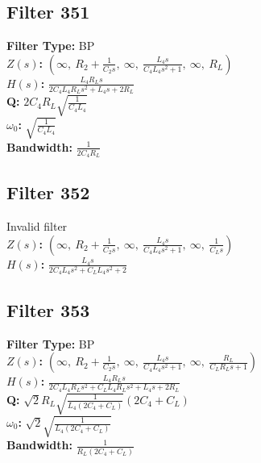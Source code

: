 \documentclass{article}
\begin{document}
\subsection*{Filter 351}
\textbf{Filter Type:} BP \\ 
\textbf{$Z(s)$:} $\left( \infty, \  R_{2} + \frac{1}{C_{2} s}, \  \infty, \  \frac{L_{4} s}{C_{4} L_{4} s^{2} + 1}, \  \infty, \  R_{L}\right)$ \\ 
\textbf{$H(s)$:} $\frac{L_{4} R_{L} s}{2 C_{4} L_{4} R_{L} s^{2} + L_{4} s + 2 R_{L}}$ \\ 
\textbf{Q:} $2 C_{4} R_{L} \sqrt{\frac{1}{C_{4} L_{4}}}$ \\ 
\textbf{$\omega_0$:} $\sqrt{\frac{1}{C_{4} L_{4}}}$ \\ 
\textbf{Bandwidth:} $\frac{1}{2 C_{4} R_{L}}$ \\ 
\subsection*{Filter 352}
Invalid filter \\ 
\textbf{$Z(s)$:} $\left( \infty, \  R_{2} + \frac{1}{C_{2} s}, \  \infty, \  \frac{L_{4} s}{C_{4} L_{4} s^{2} + 1}, \  \infty, \  \frac{1}{C_{L} s}\right)$ \\ 
\textbf{$H(s)$:} $\frac{L_{4} s}{2 C_{4} L_{4} s^{2} + C_{L} L_{4} s^{2} + 2}$ \\ 
\subsection*{Filter 353}
\textbf{Filter Type:} BP \\ 
\textbf{$Z(s)$:} $\left( \infty, \  R_{2} + \frac{1}{C_{2} s}, \  \infty, \  \frac{L_{4} s}{C_{4} L_{4} s^{2} + 1}, \  \infty, \  \frac{R_{L}}{C_{L} R_{L} s + 1}\right)$ \\ 
\textbf{$H(s)$:} $\frac{L_{4} R_{L} s}{2 C_{4} L_{4} R_{L} s^{2} + C_{L} L_{4} R_{L} s^{2} + L_{4} s + 2 R_{L}}$ \\ 
\textbf{Q:} $\sqrt{2} R_{L} \sqrt{\frac{1}{L_{4} \left(2 C_{4} + C_{L}\right)}} \left(2 C_{4} + C_{L}\right)$ \\ 
\textbf{$\omega_0$:} $\sqrt{2} \sqrt{\frac{1}{L_{4} \left(2 C_{4} + C_{L}\right)}}$ \\ 
\textbf{Bandwidth:} $\frac{1}{R_{L} \left(2 C_{4} + C_{L}\right)}$ \\ 
\end{document}
